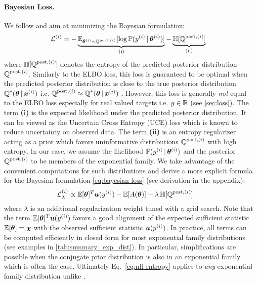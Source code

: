 \paragraph{Bayesian Loss.} We follow \cite{charpentier2020} and aim at minimizing the Bayesian formulation:
%
\begin{equation}\label{eq:bayesian-loss}
    \mathcal{L}^{(i)} = - \underbrace{\operatorname{\mathbb{E}}_{\bm{\theta}^{(i)} \sim \operatorname{\mathbb{Q}}^{\text{post},(i)}}[\log \operatorname{\mathbb{P}}(y^{(i)}\,|\, \bm{\theta} ^{(i)})]}_\text{(i)} - \underbrace{\operatorname{\mathbb{H}}[\operatorname{\mathbb{Q}}^{\text{post},(i)}]}_\text{(ii)}
\end{equation}
%
where $\operatorname{\mathbb{H}}[\operatorname{\mathbb{Q}}^{\text{post},(i)}]$ denotes the entropy of the predicted posterior distribution $\operatorname{\mathbb{Q}}^{\text{post},(i)}$. Similarly to the ELBO loss, this loss is guaranteed to be optimal when the predicted posterior distribution is close to the true posterior distribution $\operatorname{\mathbb{Q}}^*(\bm{\theta} \,|\, \bm{x}^{(i)})$ i.e. $\operatorname{\mathbb{Q}}^{\text{post},(i)} \approx \operatorname{\mathbb{Q}}^*(\bm{\theta} \,|\, \bm{x}^{(i)})$ \citep{update-belief-propagation, PAC-bayesian_estimator, opt-info-processing_bayes}. However, this loss is generally \emph{not} equal to the ELBO loss especially for real valued targets i.e. $y \in \operatorname{\mathbb{R}}$ (see \cref{sec:loss}). The term \textbf{(i)} is the expected likelihood under the predicted posterior distribution. It can be viewed as the Uncertain Cross Entropy (UCE) loss \citep{uceloss} which is known to reduce uncertainty on observed data. The term \textbf{(ii)} is an entropy regularizer acting as a prior which favors uninformative distributions $\operatorname{\mathbb{Q}}^{\text{post},(i)}$ with high entropy. In our case, we assume the likelihood $\operatorname{\mathbb{P}}(y^{(i)}\,|\,\bm{\theta}^{(i)})$ and the posterior $\operatorname{\mathbb{Q}}^{\text{post},(i)}$ to be members of the exponential family. We take advantage of the convenient computations for such distributions and derive a more explicit formula for the Bayesian formulation \eqref{eq:bayesian-loss} (see derivation in the appendix):
%
\begin{equation}\label{eq:nll-entropy}
    \begin{aligned}
    \mathcal{L}_\lambda^{(i)} &\propto \operatorname{\mathbb{E}}[\bm{\theta}]^T \bm{u}(y^{(i)}) - \operatorname{\mathbb{E}}[A(\bm{\bm{\theta}})] - \lambda\operatorname{\mathbb{H}}[\operatorname{\mathbb{Q}}^{\text{post},(i)}]
    \end{aligned}
\end{equation}
%
where $\lambda$ is an additional regularization weight tuned with a grid search. Note that the term $\operatorname{\mathbb{E}}[\bm{\theta}]^T \bm{u}(y^{(i)}) $ favors a good alignment of the expected sufficient statistic $\operatorname{\mathbb{E}}[\bm{\theta}] = \bm{\chi}$ with the observed sufficient statistic $\bm{u}(y^{(i)})$. In practice, all terms can be computed efficiently in closed form for most exponential family distributions (see examples in \cref{tab:summary_exp_dist}). In particular, simplifications are possible when the conjugate prior distribution is also in an exponential family which is often the case. Ultimately Eq.~\eqref{eq:nll-entropy} applies to \emph{any} exponential family distribution unlike \cite{charpentier2020}.

